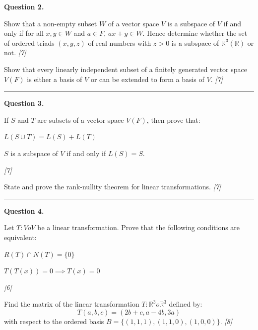 \documentclass[11pt,a4paper]{article}
\newcommand{\pts}[1]{\hfill   \textit{[#1]}}
\begin{document}
\medskip


\noindent   \textbf{Question 2.}

\begin{parts}
  \item Show that a non-empty subset $W$ of a vector space $V$ is a subspace of $V$ if and only if for all $x, y \in W$ and $a \in F$, $ax + y \in W$. Hence determine whether the set of ordered triads $(x, y, z)$ of real numbers with $z > 0$ is a subspace of $\mathbb{R}^3(\mathbb{R})$ or not. \pts{7}
  \item Show that every linearly independent subset of a finitely generated vector space $V(F)$ is either a basis of $V$ or can be extended to form a basis of $V$. \pts{7}
\end{parts}

\medskip\rule{\linewidth}{0.2pt}

\medskip


\noindent   \textbf{Question 3.}

\begin{parts}
  \item If $S$ and $T$ are subsets of a vector space $V(F)$, then prove that:
  
\begin{parts}
    \item $L(S \cup T) = L(S) + L(T)$
    \item $S$ is a subspace of $V$ if and only if $L(S) = S$.
  \end{parts} \pts{7}
  \item State and prove the rank-nullity theorem for linear transformations. \pts{7}
\end{parts}

\medskip\rule{\linewidth}{0.2pt}

\medskip


\noindent   \textbf{Question 4.}

\begin{parts}
  \item Let $T: V  o V$ be a linear transformation. Prove that the following conditions are equivalent:
  
\begin{parts}
    \item $R(T) \cap N(T) = \{0\}$
    \item $T(T(x)) = 0 \implies T(x) = 0$
  \end{parts} \pts{6}
  \item Find the matrix of the linear transformation $T: \mathbb{R}^3  o \mathbb{R}^3$ defined by:
  \[
  T(a, b, c) = (2b + c, a - 4b, 3a)
  \]
  with respect to the ordered basis $B = \{(1, 1, 1), (1, 1, 0), (1, 0, 0)\}$. \pts{8}
\end{parts}
\end{document}
